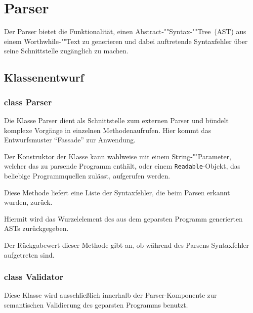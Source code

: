 \section{Parser}

Der Parser bietet die Funktionalität, einen Abstract-""Syntax-""Tree~(AST) aus einem Worthwhile-""Text zu generieren und dabei auftretende Syntaxfehler über seine Schnittstelle zugänglich zu machen.

\subsection{Klassenentwurf}

\subsubsection{class Parser}

Die Klasse Parser dient als Schnittstelle zum externen Parser und bündelt komplexe Vorgänge in einzelnen Methodenaufrufen. Hier kommt das Entwurfsmuster "`Fassade"' zur Anwendung.

\begin{description}
		Der Konstruktor der Klasse kann wahlweise mit einem String-""Parameter, welcher das zu parsende Programm enthält, oder einem \texttt{Readable}-Objekt, das beliebige Programmquellen zulässt, aufgerufen werden.

		Diese Methode liefert eine Liste der Syntaxfehler, die beim Parsen erkannt wurden, zurück.

		Hiermit wird das Wurzelelement des aus dem geparsten Programm generierten ASTs zurückgegeben.

		Der Rückgabewert dieser Methode gibt an, ob während des Parsens Syntaxfehler aufgetreten sind.
\end{description}

\subsubsection{class Validator}

Diese Klasse wird ausschließlich innerhalb der Parser-Komponente zur semantischen Validierung des geparsten Programms benutzt.


